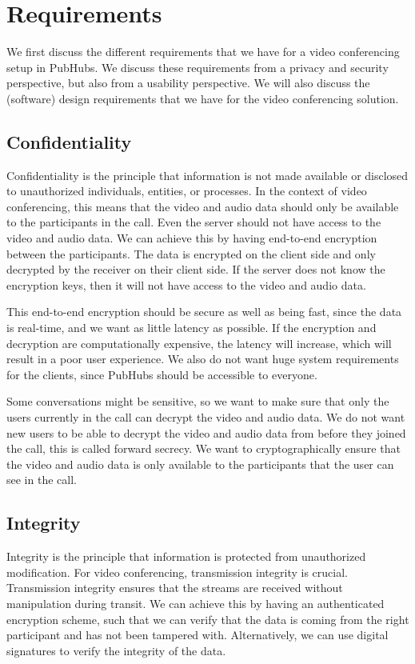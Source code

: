 \documentclass{report}
\begin{document}
\chapter{Requirements}\label{chap:requirements}
We first discuss the different requirements that we have for a video conferencing setup in PubHubs. We discuss
these requirements from a privacy and security perspective, but also from a usability perspective. We will also
discuss the (software) design requirements that we have for the video conferencing solution.

\section{Confidentiality}
Confidentiality is the principle that information is not made available or disclosed to unauthorized individuals,
entities, or processes. In the context of video conferencing, this means that the video and audio data should only
be available to the participants in the call. Even the server should not have access to the video and audio data. We
can achieve this by having end-to-end encryption between the participants. The data is encrypted on the client side and
only decrypted by the receiver on their client side. If the server does not know the encryption keys, then it will
not have access to the video and audio data.

This end-to-end encryption should be secure as well as being fast, since the data is real-time, and we want as little
latency as possible. If the encryption and decryption are computationally expensive, the latency will increase,
which will result in a poor user experience. We also do not want huge system requirements for the clients, since
PubHubs should be accessible to everyone.

Some conversations might be sensitive, so we want to make sure that only the users currently in the call can
decrypt the video and audio data. We do not want new users to be able to decrypt the video and audio data from
before they joined the call, this is called forward secrecy. We want to cryptographically ensure that
the video and audio data is only available to the participants that the user can see in the call.

\section{Integrity}
Integrity is the principle that information is protected from unauthorized modification. For video conferencing, transmission integrity
is crucial. Transmission integrity ensures that the streams are received without manipulation during transit.
We can achieve this by having an authenticated encryption scheme, such that we can verify that the data is coming from
the right participant and has not been tampered with. Alternatively, we can use digital signatures to verify the
integrity of the data.
\end{document}
